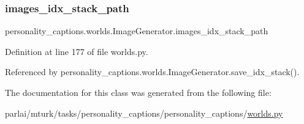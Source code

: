 \subsubsection{\texorpdfstring{images\+\_\+idx\+\_\+stack\+\_\+path}{images\_idx\_stack\_path}}
{\footnotesize\ttfamily personality\+\_\+captions.\+worlds.\+Image\+Generator.\+images\+\_\+idx\+\_\+stack\+\_\+path}



Definition at line 177 of file worlds.\+py.



Referenced by personality\+\_\+captions.\+worlds.\+Image\+Generator.\+save\+\_\+idx\+\_\+stack().



The documentation for this class was generated from the following file\+:\begin{DoxyCompactItemize}
\item 
parlai/mturk/tasks/personality\+\_\+captions/personality\+\_\+captions/\hyperlink{parlai_2mturk_2tasks_2personality__captions_2personality__captions_2worlds_8py}{worlds.\+py}\end{DoxyCompactItemize}
